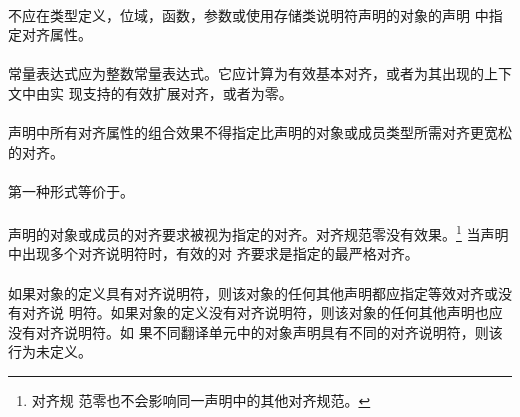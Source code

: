 \constraint
\paragraph{}
不应在类型定义，位域，函数，参数或使用存储类说明符声明的对象的声明
中指定对齐属性。

\paragraph{}
常量表达式应为整数常量表达式。它应计算为有效基本对齐，或者为其出现的上下文中由实
现支持的有效扩展对齐，或者为零。

\paragraph{}
声明中所有对齐属性的组合效果不得指定比声明的对象或成员类型所需对齐更宽松的对齐。

\semantic
\paragraph{}
第一种形式等价于\tm{))}。

\paragraph{}
声明的对象或成员的对齐要求被视为指定的对齐。对齐规范零没有效果。\footnote{对齐规
范零也不会影响同一声明中的其他对齐规范。} 当声明中出现多个对齐说明符时，有效的对
齐要求是指定的最严格对齐。

\paragraph{}
如果对象的定义具有对齐说明符，则该对象的任何其他声明都应指定等效对齐或没有对齐说
明符。如果对象的定义没有对齐说明符，则该对象的任何其他声明也应没有对齐说明符。如
果不同翻译单元中的对象声明具有不同的对齐说明符，则该行为未定义。

\syntax
